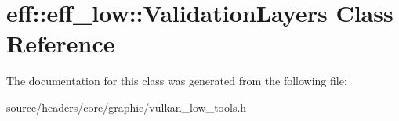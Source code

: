 \hypertarget{classeff_1_1eff__low_1_1ValidationLayers}{}\section{eff\+:\+:eff\+\_\+low\+:\+:Validation\+Layers Class Reference}
\label{classeff_1_1eff__low_1_1ValidationLayers}


The documentation for this class was generated from the following file\+:\begin{DoxyCompactItemize}
\item 
source/headers/core/graphic/vulkan\+\_\+low\+\_\+tools.\+h\end{DoxyCompactItemize}
